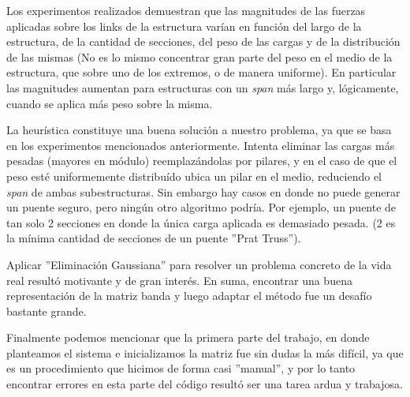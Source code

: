 	Los experimentos realizados demuestran que las magnitudes de las fuerzas aplicadas sobre los links de la estructura
varían en función del largo de la estructura, de la cantidad de secciones, del peso de las cargas y de la distribución
de las mismas (No es lo mismo concentrar gran parte del peso en el medio de la estructura, que sobre uno de los extremos,
o de manera uniforme). En particular las magnitudes aumentan para estructuras con un \emph{span} más largo y, lógicamente,
cuando se aplica más peso sobre la misma.

	La heurística constituye una buena solución a nuestro problema,
ya que se basa en los experimentos mencionados anteriormente. Intenta eliminar las cargas más pesadas (mayores en módulo)
reemplazándolas por pilares, y en el caso de que el peso esté uniformemente distribuído ubica un pilar en el medio,
reduciendo el \emph{span} de ambas subestructuras. Sin embargo hay casos en donde no puede generar un puente seguro,
pero ningún otro algoritmo podría. Por ejemplo, un puente de tan solo 2 secciones en donde la única carga aplicada
es demasiado pesada. (2 es la mínima cantidad de secciones de un puente ''Prat Truss'').

	Aplicar ''Eliminación Gaussiana'' para resolver un problema concreto de la vida real resultó motivante y de gran
interés. En suma, encontrar una buena representación de la matriz banda y luego adaptar el método fue un desafío
bastante grande.

	Finalmente podemos mencionar que la primera parte del trabajo, en donde planteamos el sistema e inicializamos
la matriz fue sin dudas la más difícil, ya que es un procedimiento que hicimos de forma casi ''manual'', y por lo
tanto encontrar
errores en esta parte del código resultó ser una tarea ardua y trabajosa.